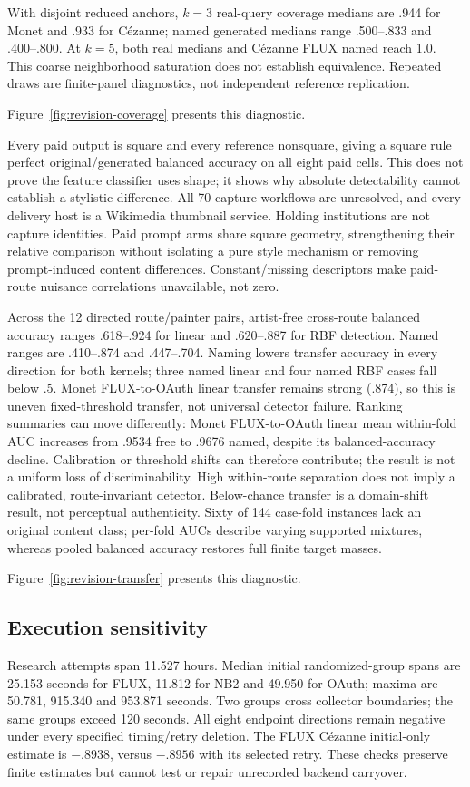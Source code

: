 With disjoint reduced anchors, $k=3$ real-query coverage medians are .944 for
Monet and .933 for C\'ezanne; named generated medians range .500--.833 and
.400--.800. At $k=5$, both real medians and C\'ezanne FLUX named reach 1.0.
This coarse neighborhood saturation does not establish equivalence. Repeated
draws are finite-panel diagnostics, not independent reference replication.

Figure~\ref{fig:revision-coverage} presents this diagnostic.

Every paid output is square and every reference nonsquare, giving a square rule
perfect original/generated balanced accuracy on all eight paid cells. This does
not prove the feature classifier uses shape; it shows why absolute detectability
cannot establish a stylistic difference. All 70 capture workflows are unresolved,
and every delivery host is a Wikimedia thumbnail service. Holding institutions
are not capture identities. Paid prompt arms share square geometry, strengthening
their relative comparison without isolating a pure style mechanism or removing
prompt-induced content differences. Constant/missing descriptors make paid-route
nuisance correlations unavailable, not zero.

Across the 12 directed route/painter pairs, artist-free cross-route balanced
accuracy ranges .618--.924 for linear and .620--.887 for RBF detection. Named
ranges are .410--.874 and .447--.704. Naming lowers transfer accuracy in every
direction for both kernels; three named linear and four named RBF cases fall
below .5. Monet FLUX-to-OAuth linear transfer remains strong (.874), so this is
uneven fixed-threshold transfer, not universal detector failure. Ranking summaries
can move differently: Monet FLUX-to-OAuth linear mean within-fold AUC increases
from .9534 free to .9676 named, despite its balanced-accuracy decline. Calibration
or threshold shifts can therefore contribute; the result is not a uniform loss
of discriminability. High within-route separation does not imply a calibrated,
route-invariant detector. Below-chance transfer
is a domain-shift result, not perceptual authenticity. Sixty of 144 case-fold
instances lack an original content class; per-fold AUCs describe varying supported mixtures,
whereas pooled balanced accuracy restores full finite target masses.

Figure~\ref{fig:revision-transfer} presents this diagnostic.

\subsection{Execution sensitivity}
Research attempts span 11.527 hours. Median initial randomized-group spans are
25.153 seconds for FLUX, 11.812 for NB2 and 49.950 for OAuth; maxima are
50.781, 915.340 and 953.871 seconds. Two groups cross collector boundaries; the
same groups exceed 120 seconds. All eight endpoint directions remain negative
under every specified timing/retry deletion. The FLUX C\'ezanne initial-only
estimate is $-.8938$, versus $-.8956$ with its selected retry. These checks
preserve finite estimates but cannot test or repair unrecorded backend carryover.

